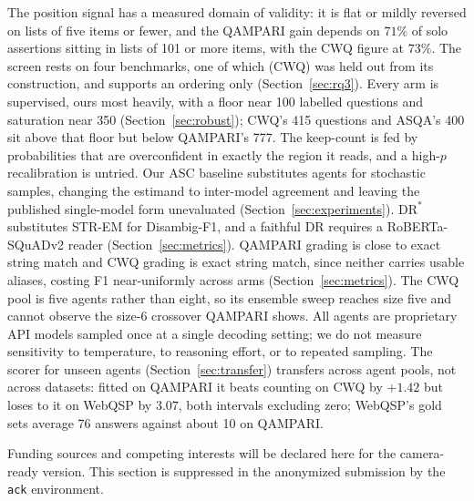 \documentclass[11pt]{article}
\begin{document}
The position signal has a measured domain of validity: it is flat or mildly reversed on lists of five items or fewer, and the QAMPARI gain depends on $71\%$ of solo assertions sitting in lists of 101 or more items, with the CWQ figure at $73\%$. The screen rests on four benchmarks, one of which (CWQ) was held out from its construction, and supports an ordering only (Section~\ref{sec:rq3}). Every arm is supervised, ours most heavily, with a floor near 100 labelled questions and saturation near 350 (Section~\ref{sec:robust}); CWQ's 415 questions and ASQA's 400 sit above that floor but below QAMPARI's 777. The keep-count is fed by probabilities that are overconfident in exactly the region it reads, and a high-$p$ recalibration is untried. Our ASC baseline substitutes agents for stochastic samples, changing the estimand to inter-model agreement and leaving the published single-model form unevaluated (Section~\ref{sec:experiments}). $\mathrm{DR}^*$ substitutes STR-EM for Disambig-F1, and a faithful DR requires a RoBERTa-SQuADv2 reader (Section~\ref{sec:metrics}). QAMPARI grading is close to exact string match and CWQ grading is exact string match, since neither carries usable aliases, costing F1 near-uniformly across arms (Section~\ref{sec:metrics}). The CWQ pool is five agents rather than eight, so its ensemble sweep reaches size five and cannot observe the size-6 crossover QAMPARI shows. All agents are proprietary API models sampled once at a single decoding setting; we do not measure sensitivity to temperature, to reasoning effort, or to repeated sampling. The scorer for unseen agents (Section~\ref{sec:transfer}) transfers across agent pools, not across datasets: fitted on QAMPARI it beats counting on CWQ by $+1.42$ but loses to it on WebQSP by $3.07$, both intervals excluding zero; WebQSP's gold sets average 76 answers against about 10 on QAMPARI.

\begin{ack}
Funding sources and competing interests will be declared here for the camera-ready
version. This section is suppressed in the anonymized submission by the
\texttt{ack} environment.
\end{ack}

%
%
\end{document}
